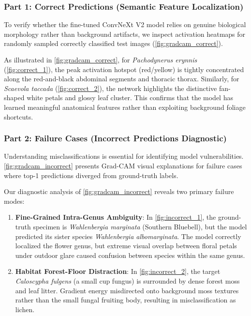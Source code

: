 \subsubsection{Part 1: Correct Predictions (Semantic Feature Localization)}
\label{sec:part1-correct}

To verify whether the fine-tuned ConvNeXt V2 model relies on genuine biological morphology rather than background artifacts, we inspect activation heatmaps for randomly sampled correctly classified test images (\cref{fig:gradcam_correct}).

As illustrated in \cref{fig:gradcam_correct}, for \textit{Pachodynerus erynnis} (\cref{fig:correct_1}), the peak activation hotspot (red/yellow) is tightly concentrated along the red-and-black abdominal segments and thoracic thorax. Similarly, for \textit{Scaevola taccada} (\cref{fig:correct_2}), the network highlights the distinctive fan-shaped white petals and glossy leaf cluster. This confirms that the model has learned meaningful anatomical features rather than exploiting background foliage shortcuts.

\subsubsection{Part 2: Failure Cases (Incorrect Predictions Diagnostic)}
\label{sec:part2-incorrect}

Understanding misclassifications is essential for identifying model vulnerabilities. \cref{fig:gradcam_incorrect} presents Grad-CAM visual explanations for failure cases where top-1 predictions diverged from ground-truth labels.

Our diagnostic analysis of \cref{fig:gradcam_incorrect} reveals two primary failure modes:
\begin{enumerate}
  \item \textbf{Fine-Grained Intra-Genus Ambiguity}: In \cref{fig:incorrect_1}, the ground-truth specimen is \textit{Wahlenbergia marginata} (Southern Bluebell), but the model predicted its sister species \textit{Wahlenbergia albomarginata}. The model correctly localized the flower genus, but extreme visual overlap between floral petals under outdoor glare caused confusion between species within the same genus.
  \item \textbf{Habitat Forest-Floor Distraction}: In \cref{fig:incorrect_2}, the target \textit{Caloscypha fulgens} (a small cup fungus) is surrounded by dense forest moss and leaf litter. Gradient energy misdirected onto background moss textures rather than the small fungal fruiting body, resulting in misclassification as lichen.
\end{enumerate}


